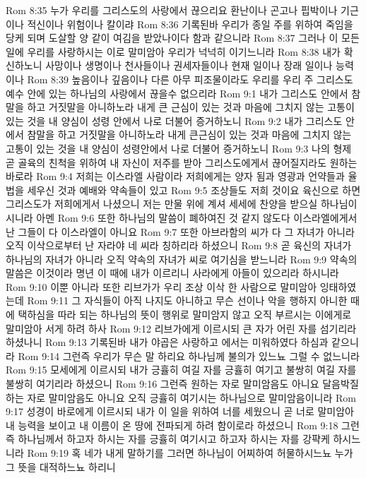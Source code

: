 Rom 8:35  누가 우리를 그리스도의 사랑에서 끊으리요 환난이나 곤고나 핍박이나 기근이나 적신이나 위험이나 칼이랴
Rom 8:36  기록된바 우리가 종일 주를 위하여 죽임을 당케 되며 도살할 양 같이 여김을 받았나이다 함과 같으니라
Rom 8:37  그러나 이 모든 일에 우리를 사랑하시는 이로 말미암아 우리가 넉넉히 이기느니라
Rom 8:38  내가 확신하노니 사망이나 생명이나 천사들이나 권세자들이나 현재 일이나 장래 일이나 능력이나
Rom 8:39  높음이나 깊음이나 다른 아무 피조물이라도 우리를 우리 주 그리스도 예수 안에 있는 하나님의 사랑에서 끊을수 없으리라
Rom 9:1  내가 그리스도 안에서 참말을 하고 거짓말을 아니하노라 내게 큰 근심이 있는 것과 마음에 그치지 않는 고통이 있는 것을 내 양심이 성령 안에서 나로 더불어 증거하노니
Rom 9:2  내가 그리스도 안에서 참말을 하고 거짓말을 아니하노라 내게 큰근심이 있는 것과 마음에 그치지 않는 고통이 있는 것을 내 양심이 성령안에서 나로 더불어 증거하노니
Rom 9:3  나의 형제 곧 골육의 친척을 위하여 내 자신이 저주를 받아 그리스도에게서 끊어질지라도 원하는 바로라
Rom 9:4  저희는 이스라엘 사람이라 저희에게는 양자 됨과 영광과 언약들과 율법을 세우신 것과 예배와 약속들이 있고
Rom 9:5  조상들도 저희 것이요 육신으로 하면 그리스도가 저희에게서 나셨으니 저는 만물 위에 계셔 세세에 찬양을 받으실 하나님이시니라 아멘
Rom 9:6  또한 하나님의 말씀이 폐하여진 것 같지 않도다 이스라엘에게서 난 그들이 다 이스라엘이 아니요
Rom 9:7  또한 아브라함의 씨가 다 그 자녀가 아니라 오직 이삭으로부터 난 자라야 네 씨라 칭하리라 하셨으니
Rom 9:8  곧 육신의 자녀가 하나님의 자녀가 아니라 오직 약속의 자녀가 씨로 여기심을 받느니라
Rom 9:9  약속의 말씀은 이것이라 명년 이 때에 내가 이르리니 사라에게 아들이 있으리라 하시니라
Rom 9:10  이뿐 아니라 또한 리브가가 우리 조상 이삭 한 사람으로 말미암아 잉태하였는데
Rom 9:11  그 자식들이 아직 나지도 아니하고 무슨 선이나 악을 행하지 아니한 때에 택하심을 따라 되는 하나님의 뜻이 행위로 말미암지 않고 오직 부르시는 이에게로 말미암아 서게 하려 하사
Rom 9:12  리브가에게 이르시되 큰 자가 어린 자를 섬기리라 하셨나니
Rom 9:13  기록된바 내가 야곱은 사랑하고 에서는 미워하였다 하심과 같으니라
Rom 9:14  그런즉 우리가 무슨 말 하리요 하나님께 불의가 있느뇨 그럴 수 없느니라
Rom 9:15  모세에게 이르시되 내가 긍휼히 여길 자를 긍휼히 여기고 불쌍히 여길 자를 불쌍히 여기리라 하셨으니
Rom 9:16  그런즉 원하는 자로 말미암음도 아니요 달음박질하는 자로 말미암음도 아니요 오직 긍휼히 여기시는 하나님으로 말미암음이니라
Rom 9:17  성경이 바로에게 이르시되 내가 이 일을 위하여 너를 세웠으니 곧 너로 말미암아 내 능력을 보이고 내 이름이 온 땅에 전파되게 하려 함이로라 하셨으니
Rom 9:18  그런즉 하나님께서 하고자 하시는 자를 긍휼히 여기시고 하고자 하시는 자를 강퍅케 하시느니라
Rom 9:19  혹 네가 내게 말하기를 그러면 하나님이 어찌하여 허물하시느뇨 누가 그 뜻을 대적하느뇨 하리니
